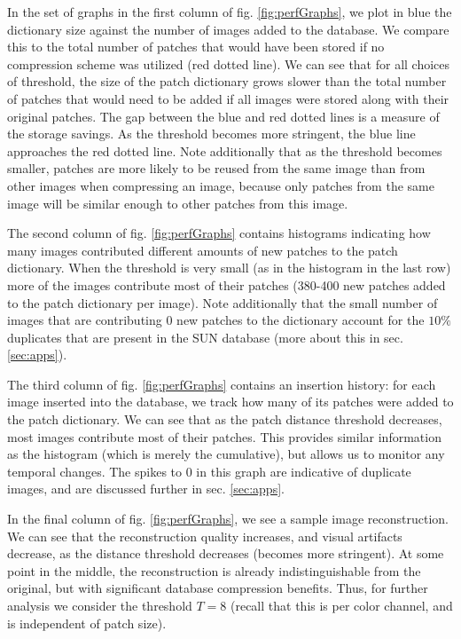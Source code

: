 In the set of graphs in the first column of fig. \ref{fig:perfGraphs}, we plot in blue the dictionary size against the number of images added to the database. We compare this to the total number of patches that would have been stored if no compression scheme was utilized (red dotted line). We can see that for all choices of threshold, the size of the patch dictionary grows slower than the total number of patches that would need to be added if all images were stored along with their original patches. The gap between the blue and red dotted lines is a measure of the storage savings. As the threshold becomes more stringent, the blue line approaches the red dotted line. Note additionally that as the threshold becomes smaller, patches are more likely to be reused from the same image than from other images when compressing an image, because only patches from the same image will be similar enough to other patches from this image.

The second column of fig. \ref{fig:perfGraphs} contains histograms indicating how many images contributed different amounts of new patches to the patch dictionary. When the threshold is very small (as in the histogram in the last row) more of the images contribute most of their patches (380-400 new patches added to the patch dictionary per image). Note additionally that the small number of images that are contributing 0 new patches to the dictionary account for the $10\%$ duplicates that are present in the SUN database (more about this in sec. \ref{sec:apps}).

The third column of fig. \ref{fig:perfGraphs} contains an insertion history: for each image inserted into the database, we track how many of its patches were added to the patch dictionary. We can see that as the patch distance threshold decreases, most images contribute most of their patches. This provides similar information as the histogram (which is merely the cumulative), but allows us to monitor any temporal changes. The spikes to 0 in this graph are indicative of duplicate images, and are discussed further in sec. \ref{sec:apps}.

In the final column of fig. \ref{fig:perfGraphs}, we see a sample image reconstruction. We can see that the reconstruction quality increases, and visual artifacts decrease, as the distance threshold decreases (becomes more stringent). At some point in the middle, the reconstruction is already indistinguishable from the original, but with significant database compression benefits. Thus, for further analysis we consider the threshold $T=8$ (recall that this is per color channel, and is independent of patch size).

